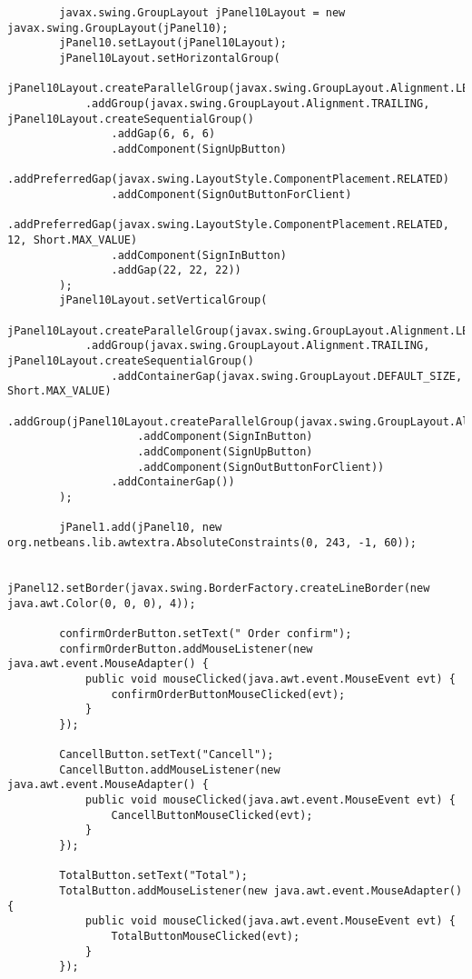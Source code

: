 \documentclass[12pt,a4paper]{article}
\begin{document}
\begin{lstlisting}
        javax.swing.GroupLayout jPanel10Layout = new javax.swing.GroupLayout(jPanel10);
        jPanel10.setLayout(jPanel10Layout);
        jPanel10Layout.setHorizontalGroup(
            jPanel10Layout.createParallelGroup(javax.swing.GroupLayout.Alignment.LEADING)
            .addGroup(javax.swing.GroupLayout.Alignment.TRAILING, jPanel10Layout.createSequentialGroup()
                .addGap(6, 6, 6)
                .addComponent(SignUpButton)
                .addPreferredGap(javax.swing.LayoutStyle.ComponentPlacement.RELATED)
                .addComponent(SignOutButtonForClient)
                .addPreferredGap(javax.swing.LayoutStyle.ComponentPlacement.RELATED, 12, Short.MAX_VALUE)
                .addComponent(SignInButton)
                .addGap(22, 22, 22))
        );
        jPanel10Layout.setVerticalGroup(
            jPanel10Layout.createParallelGroup(javax.swing.GroupLayout.Alignment.LEADING)
            .addGroup(javax.swing.GroupLayout.Alignment.TRAILING, jPanel10Layout.createSequentialGroup()
                .addContainerGap(javax.swing.GroupLayout.DEFAULT_SIZE, Short.MAX_VALUE)
                .addGroup(jPanel10Layout.createParallelGroup(javax.swing.GroupLayout.Alignment.BASELINE)
                    .addComponent(SignInButton)
                    .addComponent(SignUpButton)
                    .addComponent(SignOutButtonForClient))
                .addContainerGap())
        );

        jPanel1.add(jPanel10, new org.netbeans.lib.awtextra.AbsoluteConstraints(0, 243, -1, 60));

        jPanel12.setBorder(javax.swing.BorderFactory.createLineBorder(new java.awt.Color(0, 0, 0), 4));

        confirmOrderButton.setText(" Order confirm");
        confirmOrderButton.addMouseListener(new java.awt.event.MouseAdapter() {
            public void mouseClicked(java.awt.event.MouseEvent evt) {
                confirmOrderButtonMouseClicked(evt);
            }
        });

        CancellButton.setText("Cancell");
        CancellButton.addMouseListener(new java.awt.event.MouseAdapter() {
            public void mouseClicked(java.awt.event.MouseEvent evt) {
                CancellButtonMouseClicked(evt);
            }
        });

        TotalButton.setText("Total");
        TotalButton.addMouseListener(new java.awt.event.MouseAdapter() {
            public void mouseClicked(java.awt.event.MouseEvent evt) {
                TotalButtonMouseClicked(evt);
            }
        });


\end{lstlisting}
\end{document}
